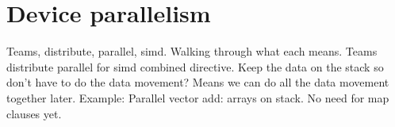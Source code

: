 
\chapter{Device parallelism}
Teams, distribute, parallel, simd.
Walking through what each means.
Teams distribute parallel for simd combined directive.
Keep the data on the stack so don’t have to do the data movement? Means we can do all the data movement together later.
Example: Parallel vector add: arrays on stack. No need for map clauses yet.
